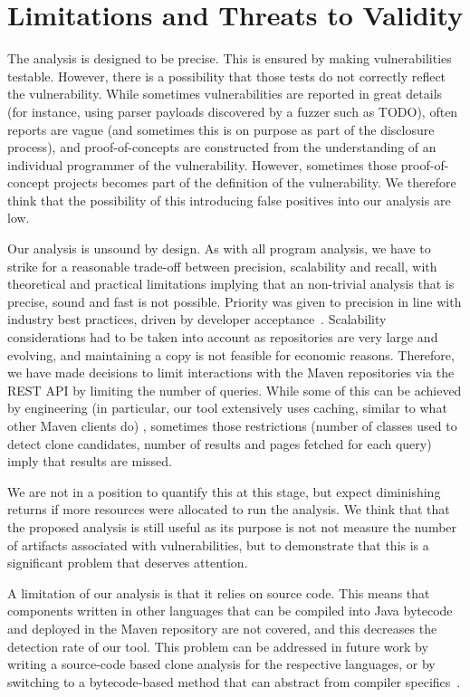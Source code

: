 \section{Limitations and Threats to Validity}
\label{sec:threats}

The analysis is designed to be precise. This is ensured by making vulnerabilities testable. However, there is a possibility that those tests do not correctly reflect the vulnerability. While sometimes vulnerabilities are reported in great details (for instance, using parser payloads discovered by a fuzzer such as TODO), often reports are vague (and sometimes this is on purpose as part of the disclosure process), and proof-of-concepts are constructed from the understanding of an individual programmer of the vulnerability. However, sometimes those proof-of-concept projects becomes part of the definition of the vulnerability. We therefore think that the possibility of this introducing false positives into our analysis are low. 

Our analysis is unsound by design. As with all program analysis, we have to strike for a reasonable trade-off between precision, scalability and recall, with theoretical and practical limitations implying that an non-trivial analysis that is precise, sound and fast is not possible. Priority was given to precision in line with industry best practices, driven by developer acceptance~\cite{bessey2010few, sadowski2018lessons, distefano2019scaling}.  Scalability considerations had to be taken into account as repositories are very large and evolving, and maintaining a copy is not feasible for economic reasons. Therefore, we have made decisions to limit interactions with  the Maven repositories via the REST API by limiting the number of queries. While some of this can be achieved by engineering (in particular, our tool extensively uses caching, similar to what other Maven clients do) , sometimes those restrictions (number of classes used to detect clone candidates, number of results and pages fetched for each query) imply that results are missed. 

We are not in a position to quantify this at this stage, but expect diminishing returns if more resources were allocated to run the analysis.  We think that that the proposed analysis is still useful as its purpose is not not measure the number of artifacts associated with vulnerabilities, but to demonstrate that this is a significant problem that deserves attention.

A limitation of our analysis is that it relies on source code. This means that components written in other languages that can be compiled into Java bytecode and deployed in the Maven repository are not covered, and this decreases the detection rate of our tool. This problem can be addressed in future work by writing a source-code based clone analysis for the respective languages, or by switching to a bytecode-based method that can abstract from compiler specifics~\cite{dann2019sootdiff}. 



 

 

